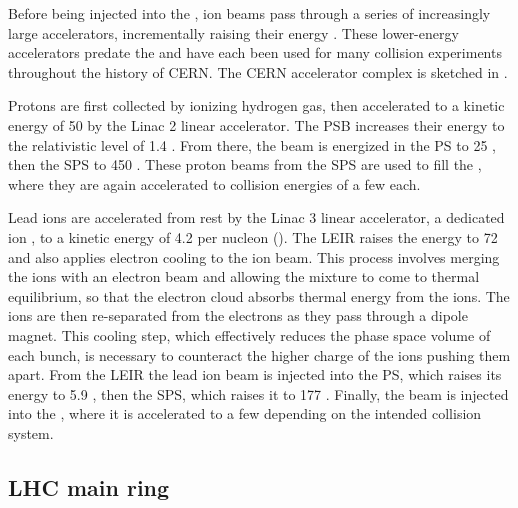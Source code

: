 Before being injected into the \lhc, ion beams pass through a series of increasingly large accelerators, incrementally raising their energy \cite{Benedikt:2004wm}.
These lower-energy accelerators predate the \lhc and have each been used for many collision experiments throughout the history of CERN.
The CERN accelerator complex is sketched in .

Protons are first collected by ionizing hydrogen gas, then accelerated to a kinetic energy of 50 \MeV by the Linac 2 linear accelerator.
The \ac{PSB} increases their energy to the relativistic level of 1.4 \GeV.
From there, the beam is energized in the \ac{PS} to 25 \GeV, then the \ac{SPS} to 450 \GeV.
These proton beams from the \ac{SPS} are used to fill the \lhc, where they are again accelerated to collision energies of a few \TeV each.

Lead ions are accelerated from rest by the Linac 3 linear accelerator, a dedicated ion \linac, to a kinetic energy of 4.2 \MeV per nucleon (\MeVn).
The \ac{LEIR} raises the energy to 72 \MeVn and also applies electron cooling to the ion beam.
This process involves merging the ions with an electron beam and allowing the mixture to come to thermal equilibrium, so that the electron cloud absorbs thermal energy from the ions.
The ions are then re-separated from the electrons as they pass through a dipole magnet.
This cooling step, which effectively reduces the phase space volume of each bunch, is necessary to counteract the higher charge of the ions pushing them apart. %
From the \ac{LEIR} the lead ion beam is injected into the PS, which raises its energy to 5.9 \GeVn, then the \ac{SPS}, which raises it to 177 \GeVn.
Finally, the beam is injected into the \lhc, where it is accelerated to a few \TeVn depending on the intended collision system.


\subsection{LHC main ring}

